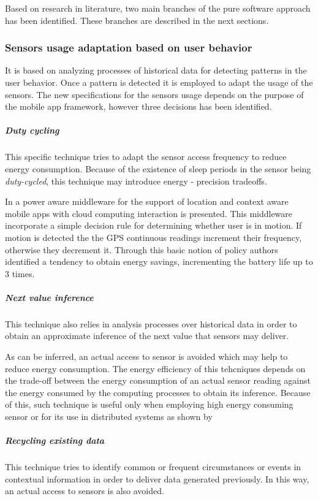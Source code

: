 Based on research in literature, two main branches of the pure software approach has been identified. These branches are described in the next sections.

\subsubsection{Sensors usage adaptation based on user behavior}
\label{ssub:sensors_usage_adaptation_based_on_user_behavior}

It is based on analyzing processes of historical data for detecting patterns in the user behavior.
Once a pattern is detected it is employed to adapt the usage of the sensors.
The new specifications for the sensors usage depends on the purpose of the mobile app framework, however three decisions has been identified.

\subparagraph{Duty cycling}
\label{subp:duty_cycling}
This specific technique tries to adapt the sensor access frequency to reduce energy consumption.
Because of the existence of sleep periods in the sensor being \emph{duty-cycled}, this technique may introduce energy - precision tradeoffs.

In \cite{Perez-Torres2012} a power aware middleware for the support of location and context aware mobile apps with cloud computing interaction is presented.
This middleware incorporate a simple decision rule for determining whether user is in motion. If motion is detected the the GPS continuous readings increment their frequency, otherwise they decrement it.
Through this basic notion of policy authors identified a tendency to obtain energy savings, incrementing the battery life up to 3 times.

\subparagraph{Next value inference}
\label{subp:next_value_inference}
This technique also relies in analysis processes over historical data in order to obtain an approximate inference of the next value that sensors may deliver.

As can be inferred, an actual access to sensor is avoided which may help to reduce energy consumption.
The energy efficiency of this tehcniques depends on the trade-off between the energy consumption of an actual sensor reading against the energy consumed by the computing processes to obtain its inference. Because of this, such technique is useful only when employing high energy consuming sensor or for its use in distributed systems as shown by \cite{Musolesi2010}

\subparagraph{Recycling existing data}
\label{subp:recycling_exsisting_data}
This technique tries to identify common or frequent circumstances or events in contextual information in order to deliver data generated previously.
In this way, an actual access to sensors is also avoided.

